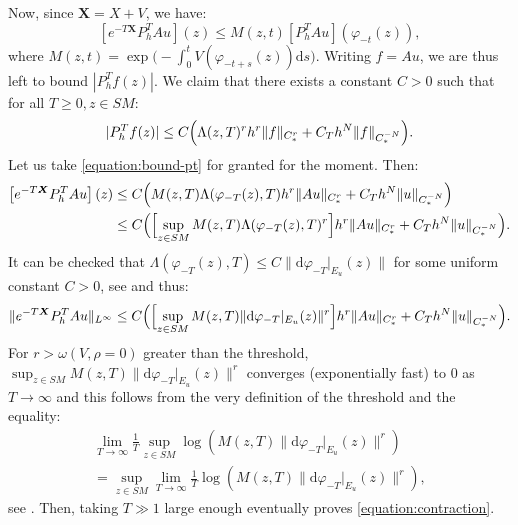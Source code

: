 \documentclass[JEP,XML,SOM,Unicode,NoFloatCountersInSection]{cedram}
\newcommand{\dd}{\mathrm{d}}
\newcommand{\X}{\boldsymbol{X}}
\theoremstyle{plain}
\theoremstyle{definition}
\begin{document}
Now, since $\X = X+V$, we have:
\begin{equation}
\label{equation:prop}
\left[e^{-T \X} P_h^T A u\right](z) \leq M(z,t) \left[ P_h^T Au\right](\varphi_{-t}(z)),
\end{equation}
where $M(z,t) = \exp\bigl(- \int_0^t V(\varphi_{-t+s}(z)) \dd s\bigr)$. Writing $f=Au$, we are thus left to bound $|P_h^T f(z)|$. We claim that there exists a constant $C > 0$ such that for all $T \geq 0,z \in SM$:
\begin{equation}
\label{equation:bound-pt}
|P_h^T f(z)| \leq C \Bigl(\Lambda(z,T)^r h^r \|f\|_{C^r_*} + C_T h^N \|f\|_{C^{-N}_*}\Bigr).
\end{equation}
Let us take \eqref{equation:bound-pt} for granted for the moment. Then:
\[
\begin{split}
\left[e^{-T \X} P_h^T A u\right](z) & \leq C \Bigl( M(z,T) \Lambda(\varphi_{-T}(z),T) h^r \|Au\|_{C^r_*} + C_T h^N \|u\|_{C^{-N}_*} \Bigr) \\
& \leq C \Bigl( \Bigl[\sup_{z \in SM} M(z,T) \Lambda(\varphi_{-T}(z),T)^r\Bigr] h^r \|Au\|_{C^r_*} + C_T h^N \|u\|_{C^{-N}_*} \Bigr).
\end{split}
\]
It can be checked that $\Lambda(\varphi_{-T}(z),T) \leq C \|\dd \varphi_{-T}|_{E_u}(z)\|$ for some uniform constant $C > 0$, see \cite[Step 2 in the proof of Th.\,3.2]{Bonthonneau-Lefeuvre-21} and thus:
\[
\|e^{-T \X} P_h^T A u\|_{L^\infty}\leq C \Bigl( \Bigl[\sup_{z \in SM} M(z,T) \|\dd \varphi_{-T}|_{E_u}(z)\|^r\Bigr] h^r \|Au\|_{C^r_*} + C_T h^N \|u\|_{C^{-N}_*} \Bigr).
\]
For $r > \omega(V,\rho=0)$ greater than the threshold, $\sup_{z \in SM} M(z,T) \|\dd \varphi_{-T}|_{E_u}(z)\|^r$ converges (exponentially fast) to $0$ as $T \to \infty$ and this follows from the very definition of the threshold and the equality:
\begin{multline*}
\lim_{T \to \infty} \frac{1}{T} \sup_{z \in SM} \log(M(z,T) \|\dd \varphi_{-T}|_{E_u}(z)\|^r) \\[-5pt]
= \sup_{z \in SM} \lim_{T \to \infty} \frac{1}{T} \log(M(z,T) \|\dd \varphi_{-T}|_{E_u}(z)\|^r),
\end{multline*}
see \cite[App.\,A]{Bonthonneau-Lefeuvre-21}. Then, taking $T \gg 1$ large enough eventually proves \eqref{equation:contraction}.
\end{document}
